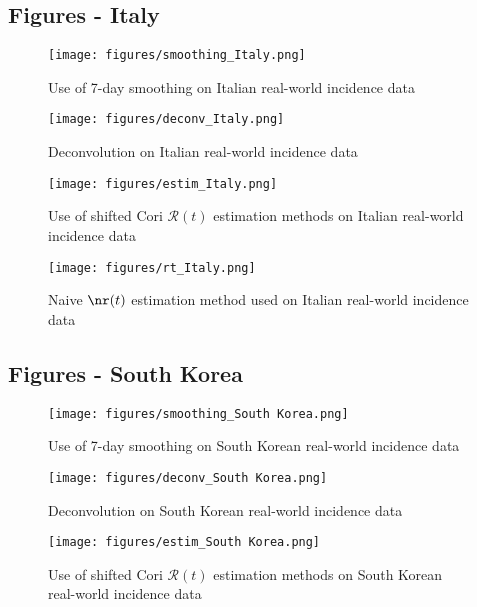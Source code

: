 \documentclass{article}
\newcommand{\nR}{\mathscr{R}}
\begin{document}
\clearpage
\subsection{Figures - Italy}
\begin{figure}[h!]
    \centering
    \texttt{[image: figures/smoothing\_Italy.png]}
    \caption{Use of 7-day smoothing on Italian real-world incidence data}
    \label{fig:my_label}
\end{figure}

\begin{figure}
    \centering
    \texttt{[image: figures/deconv\_Italy.png]}
    \caption{Deconvolution on Italian real-world incidence data}
    \label{fig:my_label}
\end{figure}

\begin{figure}[h!]
    \centering
    \texttt{[image: figures/estim\_Italy.png]}
    \caption{Use of shifted Cori $\nR(t)$ estimation methods on Italian real-world incidence data}
    \label{fig:my_label}
\end{figure}

\clearpage
\begin{figure}[h!]
    \centering
    \texttt{[image: figures/rt\_Italy.png]}
    \caption{Naive $\nr(t)$ estimation method used on Italian real-world incidence data}
    \label{fig:my_label}
\end{figure}

\clearpage
\subsection{Figures - South Korea}
\begin{figure}[h!]
    \centering
    \texttt{[image: figures/smoothing\_South Korea.png]}
    \caption{Use of 7-day smoothing on South Korean real-world incidence data}
    \label{fig:my_label}
\end{figure}

\begin{figure}
    \centering
    \texttt{[image: figures/deconv\_South Korea.png]}
    \caption{Deconvolution on South Korean real-world incidence data}
    \label{fig:my_label}
\end{figure}

\begin{figure}[h!]
    \centering
    \texttt{[image: figures/estim\_South Korea.png]}
    \caption{Use of shifted Cori $\nR(t)$ estimation methods on South Korean real-world incidence data}
    \label{fig:my_label}
\end{figure}
\end{document}
